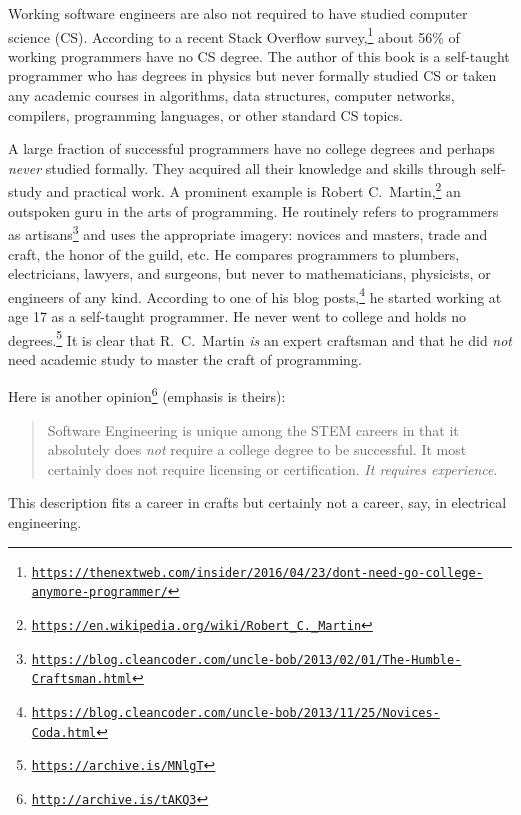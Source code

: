 Working software engineers are also not required to have studied computer
science (CS). According to a recent Stack Overflow survey,\footnote{\texttt{\href{https://thenextweb.com/insider/2016/04/23/dont-need-go-college-anymore-programmer/}{https://thenextweb.com/insider/2016/04/23/dont-need-go-college-anymore-programmer/}}}
about 56\% of working programmers have no CS degree. The author of
this book is a self-taught programmer who has degrees in physics but
never formally studied CS or taken any academic courses in algorithms,
data structures, computer networks, compilers, programming languages,
or other standard CS topics. 

A large fraction of successful programmers have no college degrees
and perhaps \emph{never} studied formally. They acquired all their
knowledge and skills through self-study and practical work. A prominent
example is Robert C.~Martin,\footnote{\texttt{\href{https://en.wikipedia.org/wiki/Robert_C._Martin}{https://en.wikipedia.org/wiki/Robert\_C.\_Martin}}}
an outspoken guru in the arts of programming. He routinely refers
to programmers as artisans\footnote{\texttt{\href{https://blog.cleancoder.com/uncle-bob/2013/02/01/The-Humble-Craftsman.html}{https://blog.cleancoder.com/uncle-bob/2013/02/01/The-Humble-Craftsman.html}}}
and uses the appropriate imagery: novices and masters, trade and craft,
the honor of the guild, etc. He compares programmers to plumbers,
electricians, lawyers, and surgeons, but never to mathematicians,
physicists, or engineers of any kind. According to one of his blog
posts,\footnote{\texttt{\href{https://blog.cleancoder.com/uncle-bob/2013/11/25/Novices-Coda.html}{https://blog.cleancoder.com/uncle-bob/2013/11/25/Novices-Coda.html}}}
he started working at age 17 as a self-taught programmer. He never
went to college and holds no degrees.\footnote{\texttt{\href{https://hashnode.com/post/i-am-robert-c-martin-uncle-bob-ask-me-anything-cjr7pnh8g000k2cs18o5nhulp/2}{https://archive.is/MNlgT}}}
It is clear that R.~C.~Martin \emph{is} an expert craftsman and
that he did \emph{not} need academic study to master the craft of
programming.

Here is another opinion\footnote{\texttt{\href{http://archive.is/tAKQ3}{http://archive.is/tAKQ3}}}
(emphasis is theirs):
\begin{quotation}
{\small{}Software Engineering is unique among the STEM careers in
that it absolutely does }\emph{\small{}not}{\small{} require a college
degree to be successful. It most certainly does not require licensing
or certification. }\emph{\small{}It requires experience}{\small{}.}{\small\par}
\end{quotation}
This description fits a career in crafts \textemdash{} but certainly
not a career, say, in electrical engineering.

